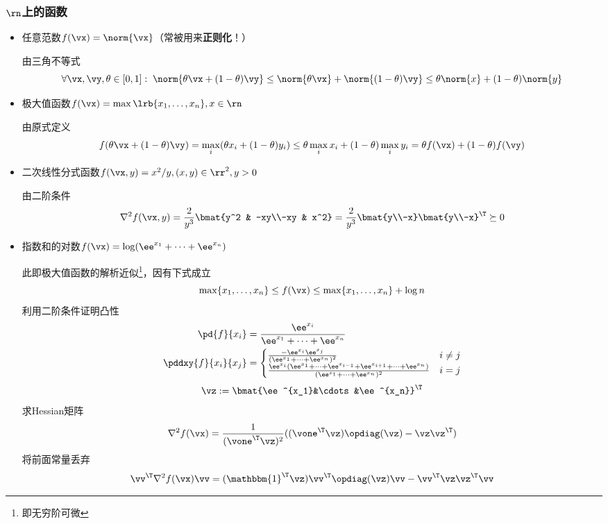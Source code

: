 \subsubsection{$\rn$上的函数}
\begin{itemize}
	\item 任意范数$f(\vx)=\norm{\vx}$（常被用来\textbf{正则化}！）
\begin{analysis}
	由三角不等式
\[\forall \vx,\vy,\theta\in[0,1]:\;
\norm{\theta \vx+(1-\theta)\vy}\leq \norm{\theta \vx}+\norm{(1-\theta)\vy}\leq \theta \norm{x}+(1-\theta)\norm{y}\]
\end{analysis}
	\item 极大值函数$f(\vx)=\max\lrb{x_1,\ldots,x_n},x\in\rn$
\begin{analysis}
	由原式定义
	\[f(\theta\vx+(1-\theta)\vy)=\max_i(\theta x_i+(1-\theta)y_i)\leq\theta\max_i x_i+(1-\theta)\max_i y_i=\theta f(\vx)+(1-\theta)f(\vy)\]
\end{analysis}
	\item 二次线性分式函数$f(\vx,y)=x^2/y,(x,y)\in\rr^2,y>0$
\begin{analysis}
	由二阶条件
	\[\nabla^2f(\vx,y)=\frac{2}{y^3}\bmat{y^2 & -xy\\-xy & x^2}=\frac{2}{y^3}\bmat{y\\-x}\bmat{y\\-x}^\T\succeq 0\]
\end{analysis}
	\item 指数和的对数$f(\vx)=\log(\ee^{x_1}+\cdots+\ee^{x_n})$
\begin{analysis}
此即极大值函数的解析近似\footnote{即无穷阶可微}，因有下式成立
\[\max\{x_1,\ldots,x_n\}\leq f(\vx)\leq\max\{x_1,\ldots,x_n\}+\log n\]
利用二阶条件证明凸性
\[\begin{aligned}
\pd{f}{x_i}&=\frac{\ee^{x_i}}{\ee^{x_1}+\cdots+\ee^{x_n}}\\
\pddxy{f}{x_i}{x_j}&=
\begin{cases}
\frac{-\ee^{x_i}\ee^{x_j}}{(\ee^{x_1}+\cdots+\ee^{x_n})^2} & i\ne j\\
\frac{\ee^{x_i}(\ee^{x_1}+\cdots+\ee^{x_{i-1}}+\ee^{x_{i+1}}+\cdots+\ee^{x_n})}{(\ee^{x_1}+\cdots+\ee^{x_n})^2} & i=j
\end{cases}
\end{aligned}\]
\[\vz:=\bmat{\ee^{x_1}&\cdots&\ee^{x_n}}^\T\]
求Hessian矩阵
\[\nabla^2f(\vx)=\frac{1}{(\vone^\T \vz)^2}((\vone^\T \vz)\opdiag(\vz)-\vz \vz^\T)\]
将前面常量丢弃
\[\begin{aligned}
\vv^\T \nabla^2f(\vx)\vv&=(\mathbbm{1}^\T \vz)\vv^\T \opdiag(\vz)\vv-\vv^\T \vz\vz^\T \vv\\

\end{aligned}\]
\end{analysis}
\end{itemize}
